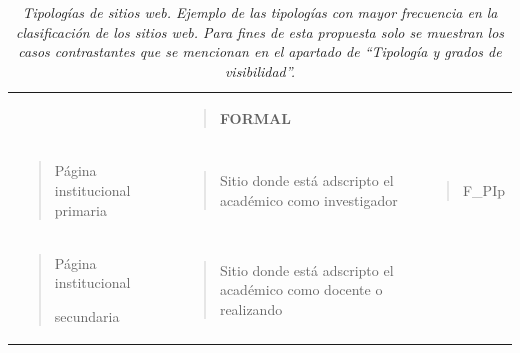 \documentclass[
]{interact}
\begin{document}
\begin{longtable}[]{@{}
  >{\raggedright\arraybackslash}p{}
  >{\raggedright\arraybackslash}p{}
  >{\raggedright\arraybackslash}p{}@{}}
\caption{\emph{Tipologías de sitios web. Ejemplo de las tipologías con
mayor frecuencia en la clasificación de los sitios web. Para fines de
esta propuesta solo se muestran los casos contrastantes que se mencionan
en el apartado de ``Tipología y grados de
visibilidad''.}}\tabularnewline
\toprule\noalign{}
\endfirsthead
\endhead
\bottomrule\noalign{}
\endlastfoot
& \begin{minipage}[t]{\linewidth}\raggedright
\begin{quote}
\textbf{FORMAL}
\end{quote}
\end{minipage} & \\
\begin{minipage}[t]{\linewidth}\raggedright
\begin{quote}
Página institucional primaria
\end{quote}
\end{minipage} & \begin{minipage}[t]{\linewidth}\raggedright
\begin{quote}
Sitio donde está adscripto el académico como investigador
\end{quote}
\end{minipage} & \begin{minipage}[t]{\linewidth}\raggedright
\begin{quote}
F\_PIp
\end{quote}
\end{minipage} \\
\begin{minipage}[t]{\linewidth}\raggedright
\begin{quote}
Página institucional

secundaria
\end{quote}
\end{minipage} & \begin{minipage}[t]{\linewidth}\raggedright
\begin{quote}
Sitio donde está adscripto el académico como docente o realizando


\end{quote}
\end{minipage}
\end{longtable}
\end{document}
